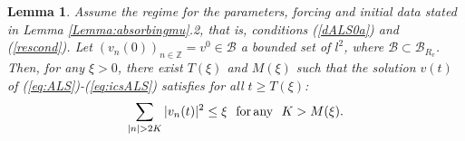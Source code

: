 \documentclass[preprintnumbers,amsmath,amssymb]{revtex4}
\newtheorem{lemma}{Lemma}[section]
\begin{document}
\begin{lemma}
\label{Lemma:asymtailmu}	
Assume the regime for the parameters, forcing and initial data stated in Lemma \ref{Lemma:absorbingmu}.2, that is, conditions (\ref{dALS0a}) and (\ref{rescond}). Let $(v_n(0))_{n\in {\mathbb{Z}}}=v^0 \in \mathcal{B}$ a bounded set of $l^2$, where $\mathcal{B}\subset \mathcal{B}_{R_v}$. Then, for any $\xi>0$, there exist
 $T(\xi)$ and $M(\xi)$ such that the solution $v(t)$ of (\ref{eq:ALS})-(\ref{eq:icsALS}) satisfies for all $t\ge T(\xi)$:
 \begin{equation}
  \sum_{|n|> 2K}|v_n(t)|^2\le \xi\,\,\,\,{\rm for\, any\,\,\,\,} K>M(\xi).\label{eq:asymptotic}
 \end{equation}
\end{lemma}

\end{document}
